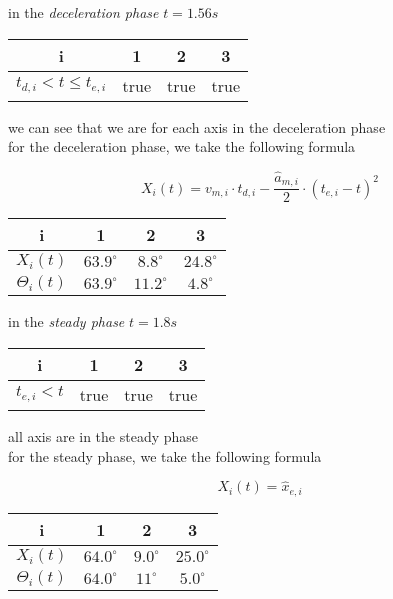 \documentclass[%
  professionalfonts,%
  xcolor={%
    usenames,%
    dvipsnames,%
    svgnames,%
    table,%
    hyperref%
  }%
]{beamer}
\begin{document}
\begin{frame}
in the \emph{deceleration phase} $t = 1.56s$

\begin{center}
\begin{tabular}{cccc}
\toprule
i & 1 & 2 & 3 \\
\midrule
$t_{d,i} < t \leq t_{e,i}$ & true & true & true \\
\bottomrule 
\end{tabular}
\end{center}

we can see that we are for each axis in the deceleration phase\\
for the deceleration phase, we take the following formula

\begin{equation*}
X_{i}(t)=v_{m,i} \cdot t_{d,i} - \frac{\hat{a}_{m,i}}{2} \cdot (t_{e,i} - t)^2  
\end{equation*}

\begin{center}
\begin{tabular}{cccc}
\toprule
i & 1 & 2 & 3 \\
\midrule
$X_{i}(t)$      & $63.9^\circ$ & $8.8^\circ$  & $24.8^\circ$ \\
$\Theta_{i}(t)$ & $63.9^\circ$ & $11.2^\circ$ & $4.8^\circ$ \\
\bottomrule
\end{tabular}
\end{center} 
\end{frame}

\begin{frame}
  in the \emph{steady phase} $t = 1.8s$
  
  \begin{center}
    \begin{tabular}{cccc}
      \toprule
      i & 1 & 2 & 3 \\
      \midrule
      $t_{e,i} < t$ & true & true & true \\
      \bottomrule 
    \end{tabular}
  \end{center}
  
  all axis are in the steady phase\\
  for the steady phase, we take the following formula
  
  \begin{equation*}
  X_{i}(t)= \hat{x}_{e,i}
  \end{equation*}
  
  \begin{center}
    \begin{tabular}{cccc}
      \toprule
      i & 1 & 2 & 3 \\
      \midrule
      $X_{i}(t)$      & $64.0^\circ$ & $9.0^\circ$ & $25.0^\circ$ \\
      $\Theta_{i}(t)$ & $64.0^\circ$ & $11^\circ$  & $5.0^\circ$ \\
      \bottomrule
    \end{tabular}
  \end{center} 
\end{frame}
\end{document}

